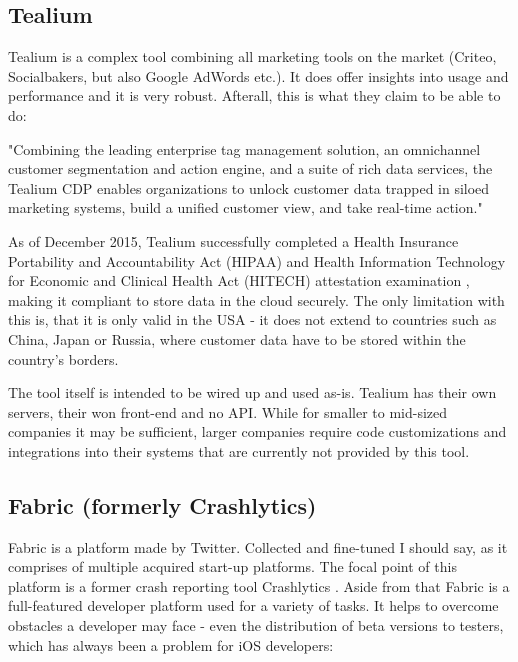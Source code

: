 \subsection{Tealium}

Tealium is a complex tool combining all marketing tools on the market (Criteo, Socialbakers, but also Google AdWords etc.). It does offer insights into usage and performance and it is very robust. Afterall, this is what they claim to be able to do:

\bigbreak

"Combining the leading enterprise tag management solution, an omnichannel customer segmentation and action engine, and a suite of rich data services, the Tealium CDP enables organizations to unlock customer data trapped in siloed marketing systems, build a unified customer view, and take real-time action." \cite{tealium}

\bigbreak

As of December 2015, Tealium successfully completed a Health Insurance Portability and Accountability Act (HIPAA) and Health Information Technology for Economic and Clinical Health Act (HITECH) attestation examination \cite{hipaa}, making it compliant to store data in the cloud securely. The only limitation with this is, that it is only valid in the USA - it does not extend to countries such as China, Japan or Russia, where customer data have to be stored within the country's borders.

The tool itself is intended to be wired up and used as-is. Tealium has their own servers, their won front-end and no API. While for smaller to mid-sized companies it may be sufficient, larger companies require code customizations and integrations into their systems that are currently not provided by this tool.

\subsection{Fabric (formerly Crashlytics)}

Fabric is a platform made by Twitter. Collected and fine-tuned I should say, as it comprises of multiple acquired start-up platforms. The focal point of this platform is a former crash reporting tool Crashlytics \cite{crashlytics}. Aside from that Fabric is a full-featured developer platform used for a variety of tasks. It helps to overcome obstacles a developer may face - even the distribution of beta versions to testers, which has always been a problem for iOS developers:

